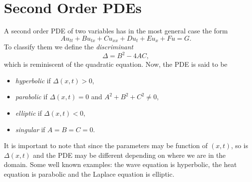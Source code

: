 \section{Second Order PDEs}

A second order PDE of two variables has in the most general case the form
\[
  Au_{tt} + Bu_{tx} + Cu_{xx} + Du_{t} + Eu_x + Fu = G.
\]
To classify them we define the \emph{discriminant}
\[
  \Delta = B^2 - 4AC,
\]
which is reminiscent of the quadratic equation. Now, the PDE is said to be
\begin{itemize}
  \item \emph{hyperbolic} if $\Delta(x,t) > 0$,
  \item \emph{parabolic} if $\Delta(x,t) = 0$ and $A^2 + B^2 + C^2 \neq 0$,
  \item \emph{elliptic} if $\Delta(x,t) < 0$,
  \item \emph{singular} if $A = B = C = 0$.
\end{itemize}
It is important to note that since the parameters may be function of $(x,t)$,
so is $\Delta(x,t)$ and the PDE may be different depending on where we are in
the domain. Some well known examples: the wave equation is hyperbolic, the
heat equation is parabolic and the Laplace equation is elliptic.
